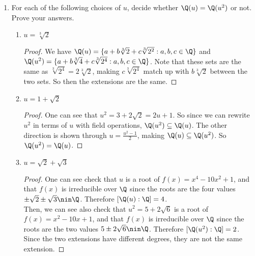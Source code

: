 \documentclass[12pt]{article}
\begin{document}
\begin{enumerate}
		\item For each of the following choices of $u$, decide whether $\Q(u) = \Q(u^2)$ or not. Prove your answers.
		\begin{enumerate}
			\item $u = \sqrt[3]{2}$
			\begin{proof}
					We have $\Q(u) = \{a + b\sqrt[3]{2} + c\sqrt[3]{2^2}: a,b,c\in\Q\}$ and $\Q(u^2) = \{a + b\sqrt[3]{4} + c\sqrt[3]{2^4}: a,b,c\in\Q\}$. Note that these sets are the same as $\sqrt[3]{2^4} = 2\sqrt[3]{2}$, making $c\sqrt[3]{2^4}$ match up with $b\sqrt[3]{2}$ between the two sets. So then the extensions are the same.
			\end{proof}
			\item $u = 1 + \sqrt{2}$
			\begin{proof}
				One can see that $u^2 = 3 + 2\sqrt{2} = 2u + 1$. So since we can rewrite $u^2$ in terms of $u$ with field operations, $\Q(u^2) \subseteq \Q(u)$. The other direction is shown through $u = \frac{u^2-1}{2}$, making $\Q(u) \subseteq \Q(u^2)$. So $\Q(u^2) = \Q(u)$.
			\end{proof}
			\item $u = \sqrt{2} + \sqrt{3}$
			\begin{proof}
				One can see check that $u$ is a root of $f(x) = x^4-10x^2+1$, and that $f(x)$ is irreducible over $\Q$ since the roots are the four values $\pm\sqrt{2}\pm\sqrt{3} \nin \Q$. Therefore $[\Q(u):\Q] = 4$.\\
				Then, we can see also check that $u^2 = 5+2\sqrt{6}$ is a root of $f(x) = x^2-10x+1$, and that $f(x)$ is irreducible over $\Q$ since the roots are the two values $5\pm2\sqrt{6} \nin \Q$. Therefore $[\Q(u^2):\Q] = 2$.\\
				Since the two extensions have different degrees, they are not the same extension.
			\end{proof}
		\end{enumerate}
		
	\end{enumerate}
\end{document}
